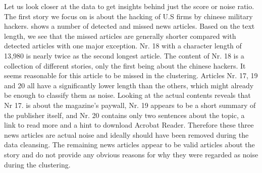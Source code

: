 Let us look closer at the data to get insights behind just the score or noise ratio.
The first story we focus on is about the hacking of U.S firms by chinese military hackers.
 shows a number of detected and missed news articles.
Based on the text length, we see that the missed articles are generally shorter
compared with detected articles with one major exception.
Nr. 18 with a character length of 13,980 is nearly twice as the second longest article.
The content of Nr. 18 is a collection of different stories, only the first being about the chinese hackers.
It seems reasonable for this article to be missed in the clustering.
Articles Nr. 17, 19 and 20 all have a significantly lower length than the others,
which might already be enough to classify them as noise.
Looking at the actual contents reveals that Nr 17. is about the magazine's paywall,
Nr. 19 appears to be a short summary of the publisher itself, and Nr. 20 contains only two sentences about the topic,
a link to read more and a hint to download Acrobat Reader.
Therefore these three news articles are actual noise and ideally should have been removed during the data cleansing.
The remaining news articles appear to be valid articles about the story
and do not provide any obvious reasons for why they were regarded as noise during the clustering.

